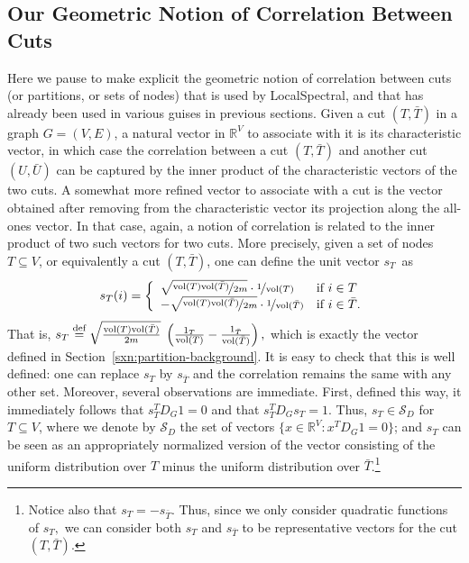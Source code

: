 \documentclass[11pt]{article}
\newcommand{\nfrac}{\nicefrac}
\newcommand{\defeq}{\stackrel{\textup{def}}{=}}
\newcommand{\vol}{\mathrm{vol}}
\begin{document}
\subsection{Our Geometric Notion of Correlation Between Cuts}
\label{sxn:partition-geometric}


Here we pause to make explicit the geometric notion of correlation between 
cuts (or partitions, or sets of nodes) that is used by \textsf{LocalSpectral}, 
and that has already been used in various guises in previous sections.
Given a cut $(T,\bar{T})$ in a graph $G=(V,E)$, a natural vector in 
$\mathbb{R}^{V}$ to associate with it is its characteristic vector, in which
case the correlation between a cut $(T,\bar{T})$ and another cut 
$(U,\bar{U})$ can be captured by the inner product of the characteristic 
vectors of the two cuts. 
A somewhat more refined vector to associate with a cut is the vector 
obtained after removing from the characteristic vector its projection along 
the all-ones vector.  
In that case, again, a notion of correlation is related to the inner product 
of two such vectors for two cuts. 
More precisely, given a set of nodes $T \subseteq V$, or equivalently a cut 
$(T,\bar{T})$, one can define the unit vector $s_{T}$~as
\[ 
s_{T}(i) = \left\{ \begin{array}{ll}
                      \sqrt{\nfrac{\vol(T)\vol(\bar{T})}{2m}} \cdot \nfrac{1}{\vol(T)}  & \mbox{if $i \in T $} \\
                      - \sqrt{\nfrac{\vol(T)\vol(\bar{T})}{2m}} \cdot \nfrac{1}{\vol(\bar{
T})}    & \mbox{if $i \in \bar{T}$}   .
                   \end{array}
           \right. \]
That is, 
$
s_T \defeq  \sqrt{\frac{\vol(T)\vol(\bar{T})}{2m}} \; \left(\frac{1_T}{\vol(T)} - \frac{1_{\bar{T}}}{\vol(\bar{T})}\right)   ,
$
which is exactly the vector defined in Section~\ref{sxn:partition-background}.
It is easy to check that this is well defined: one can replace $s_{T}$ by 
$s_{\bar{T}}$ and the correlation remains the same with any other set. 
Moreover, several observations are immediate.
First, defined this way, it immediately follows that 
$ s_T^T D_G 1 = 0$ and that $ s_T^T D_G s_T = 1$. 
Thus, $s_T \in \mathcal{S}_{D}$ for $T \subseteq V$, where we denote by 
$\mathcal{S}_{D}$ the set of vectors $\{x \in \mathbb{R}^V: x^T D_G 1 = 0\}$;
and $s_T$ can be seen as an appropriately normalized version of the vector 
consisting of the uniform distribution over $T$ minus the uniform 
distribution over $\bar{T}$.\footnote{Notice also that $s_T = - s_{\bar{T}}$.  Thus, since 
we only consider quadratic functions of $s_T,$ we 
can consider both $s_T$ and $s_{\bar{T}}$ to be representative vectors for 
the cut $(T, \bar{T}).$ }
\end{document}
